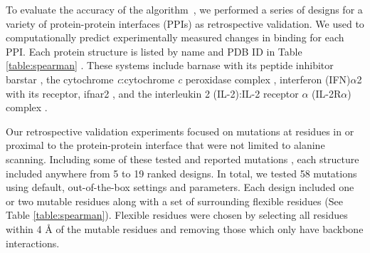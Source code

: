 To evaluate the accuracy of the \osprey \ks algorithm~\cite{K*}, we performed a series of designs for a variety of protein-protein interfaces (PPIs) as retrospective validation. We used \ks to computationally predict experimentally measured changes in binding for each PPI. Each protein structure is listed by name and PDB ID in Table \ref{table:spearman} \cite{pdb1x1u,pdb2pcb,pdb3s9d,pdb2b5i}.  These systems include barnase with its peptide inhibitor barstar \cite{binding2barnase,bindingbarnase}, the cytochrome {\it c}:cytochrome {\it c} peroxidase complex \cite{bindingcytc}, interferon (IFN)$\alpha$2 with its receptor, ifnar2  \cite{bindingifna2}, and the interleukin 2 (IL-2):IL-2 receptor $\alpha$ (IL-2R$\alpha$) complex \cite{bindingil2}.

Our retrospective validation experiments focused on mutations at residues in or proximal to the protein-protein interface that were not limited to alanine scanning. Including some of these tested and reported mutations \cite{binding2barnase,bindingbarnase,bindingcytc,bindingifna2,bindingil2}, each structure included anywhere from 5 to 19 ranked designs. In total, we tested 58 mutations using default, out-of-the-box \osprey settings and parameters. Each design included one or two mutable residues along with a set of surrounding flexible residues (See Table \ref{table:spearman}). Flexible residues were chosen by selecting all residues within 4 {\AA} of the mutable residues and removing those which only have backbone interactions. 

